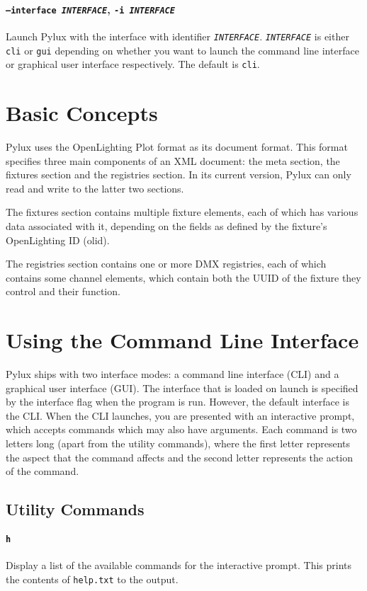 \documentclass[a4paper]{article}
\begin{document}
\paragraph{\texttt{--interface \textit{INTERFACE}}, \texttt{-i 
\textit{INTERFACE}}}
Launch Pylux with the interface with identifier \texttt{\textit{INTERFACE}}.
\texttt{\textit{INTERFACE}} is either \texttt{cli} or \texttt{gui} depending on 
whether you want to launch the command line interface or graphical user 
interface respectively. The default is \texttt{cli}.

\section{Basic Concepts}
Pylux uses the OpenLighting Plot format as its document format. This format 
specifies three main components of an XML document: the meta section, the 
fixtures section and the registries section. In its current version, Pylux 
can only read and write to the latter two sections.

The fixtures section contains multiple fixture elements, each of which has 
various data associated with it, depending on the fields as defined by the 
fixture's OpenLighting ID (olid).

The registries section contains one or more DMX registries, each of which 
contains some channel elements, which contain both the UUID of the fixture 
they control and their function.

\section{Using the Command Line Interface}
Pylux ships with two interface modes: a command line interface (CLI) and a 
graphical user interface (GUI). The interface that is loaded on launch is 
specified by the interface flag when the program is run. However, the 
default interface is the CLI. When the CLI launches, you are presented with an 
interactive prompt, which accepts commands which may also have arguments. Each 
command is two letters long (apart from the utility commands), where the first 
letter represents the aspect that the command affects and the second letter 
represents the action of the command.

\subsection{Utility Commands}

\paragraph{\texttt{h}}
Display a list of the available commands for the interactive prompt. This 
prints the contents of \texttt{help.txt}  to the output.
\end{document}

